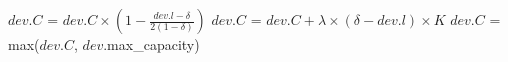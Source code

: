 \begin{algorithm}[t]
\begin{algorithmic}[1]
        \State \(dev.C\) = \(dev.C \times (1 - \frac{dev.l-\delta}{2(1-\delta)})\) 
        \State \(dev.C\) = \(dev.C + \lambda \times (\delta -dev.l)\times K \) 
    \EndIf
    \State \(dev.C\) = max(\(dev.C\), \(dev.\)max_capacity)
    \EndProcedure
    
    
\end{algorithmic}
\end{algorithm}

